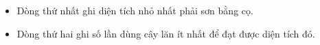 \begin{itemize}
	\item     Dòng thứ nhất ghi diện tích nhỏ nhất phải sơn bằng cọ.   
	\item     Dòng thứ hai ghi số lần dùng cây lăn ít nhất để đạt được diện tích đó.   
\end{itemize}

\